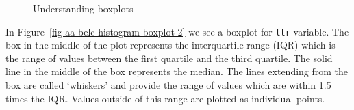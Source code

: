 \documentclass[
  letterpaper,
]{latex/krantz}
\theoremstyle{definition}
\theoremstyle{remark}
\begin{document}
\begin{figure}[H]

\begin{minipage}{\linewidth}



\end{minipage}%
\newline
\begin{minipage}{\linewidth}



\end{minipage}%

\caption{\label{fig-aa-belc-histogram-boxplot}Understanding boxplots}

\end{figure}%

In Figure~\ref{fig-aa-belc-histogram-boxplot-2} we see a boxplot for
\texttt{ttr} variable. The box in the middle of the plot represents the
interquartile range (IQR) which is the range of values between the first
quartile and the third quartile. The solid line in the middle of the box
represents the median. The lines extending from the box are called
`whiskers' and provide the range of values which are within 1.5 times
the IQR. Values outside of this range are plotted as individual points.
\end{document}
